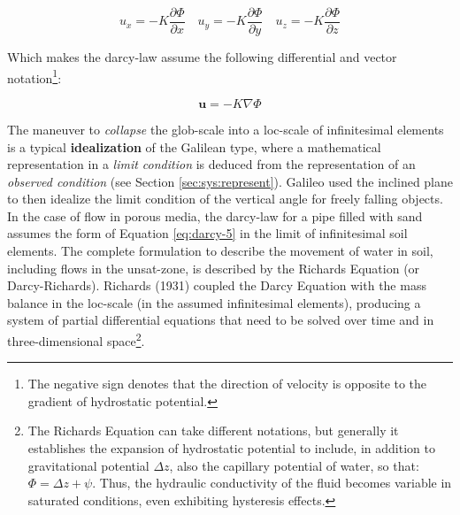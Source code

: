 \documentclass[./main_en.tex]{subfiles}
\begin{document}
\begin{linenomath*}
\begin{equation}
\label{eq:darcy-4}
u_x = - K\frac{\partial \Phi}{\partial x} \quad 
u_y = - K\frac{\partial \Phi}{\partial y} \quad 
u_z = - K\frac{\partial \Phi}{\partial z}
\end{equation}
\end{linenomath*}
\noindent Which makes the \gls{darcy-law} assume the following differential and vector notation\footnote{The negative sign denotes that the direction of velocity is opposite to the gradient of hydrostatic potential.}:
\begin{linenomath*}
\begin{equation}
\label{eq:darcy-5}
\textbf{u} = - K \nabla \Phi
\end{equation}
\end{linenomath*}

\par The maneuver to \textit{collapse} the \gls{glob-scale} into a \gls{loc-scale} of infinitesimal elements is a typical \textbf{\gls{idealization}} of the Galilean type, where a mathematical representation in a \textit{limit condition} is deduced from the representation of an \textit{observed condition} (see Section \ref{sec:sys:represent}). Galileo used the inclined plane to then idealize the limit condition of the vertical angle for freely falling objects. In the case of flow in porous media, the \gls{darcy-law} for a pipe filled with sand assumes the form of Equation \eqref{eq:darcy-5} in the limit of infinitesimal soil elements. The complete formulation to describe the movement of water in soil, including flows in the \gls{unsat-zone}, is described by the Richards Equation (or Darcy-Richards). Richards (1931) \cite{Richards1931a} coupled the Darcy Equation with the mass balance in the \gls{loc-scale} (in the assumed infinitesimal elements), producing a \gls{system} of partial differential equations that need to be solved over time and in three-dimensional space\footnote{The Richards Equation can take different notations, but generally it establishes the expansion of hydrostatic potential to include, in addition to gravitational potential $\Delta z$, also the capillary potential of water, so that: $\Phi = \Delta z + \psi$. Thus, the hydraulic conductivity of the fluid becomes variable in saturated conditions, even exhibiting hysteresis effects.}.
\end{document}
